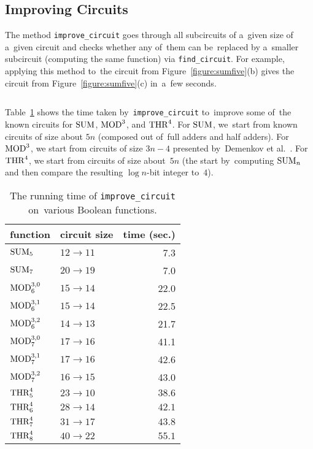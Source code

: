 \subsection{Improving Circuits}
The method \texttt{improve_circuit}
goes through all subcircuits of a~given size
of a~given circuit and checks whether any
of~them can be~replaced by a~smaller subcircuit
(computing the same function) via \texttt{find_circuit}. For example, applying this method
to~the circuit from Figure~\ref{figure:sumfive}(b)
gives the circuit from Figure~\ref{figure:sumfive}(c)
in~a~few seconds.
%
\inputminted[firstline=62,lastline=67]{python}{../tutorial.py}
Table~\ref{table:improvementrunningtimes} shows the time
taken by~\texttt{improve\_circuit} to~improve some
of~the known circuits for $\operatorname{SUM}$, $\operatorname{MOD}^3$, and $\operatorname{THR}^4$.
For $\operatorname{SUM}$, we~start from known circuits of size about $5n$
(composed out of~full adders and half adders). For $\operatorname{MOD}^3$,
we start from circuits of size $3n-4$ presented by~Demenkov et al.~\cite{DBLP:journals/ipl/DemenkovKKY10}. For $\operatorname{THR}^4$, we start from circuits of
size about~$5n$ (the start by~computing $\operatorname{SUM}_n$ and then compare the
resulting $\log n$-bit integer to~$4$).

\begin{table}[ht]
\begin{center}
\begin{tabular}{llr}
\toprule
function & circuit size & time (sec.)\\
\midrule
$\operatorname{SUM}_5$ & $12 \to 11$ & 7.3\\
$\operatorname{SUM}_7$ & $20 \to 19$ & 7.0\\
\midrule
$\operatorname{MOD}_6^{3,0}$ & $15 \to 14$ & 22.0\\
$\operatorname{MOD}_6^{3,1}$ & $15 \to 14$ & 22.5\\
$\operatorname{MOD}_6^{3,2}$ & $14 \to 13$ & 21.7\\
$\operatorname{MOD}_7^{3,0}$ & $17 \to 16$ & 41.1\\
$\operatorname{MOD}_7^{3,1}$ & $17 \to 16$ & 42.6\\
$\operatorname{MOD}_7^{3,2}$ & $16 \to 15$ & 43.0\\
\midrule
$\operatorname{THR}^4_5$ & $23 \to 10$ & $38.6$\\
$\operatorname{THR}^4_6$ & $28 \to 14$ & $42.1$\\
$\operatorname{THR}^4_7$ & $31 \to 17$ & $43.8$\\
$\operatorname{THR}^4_8$ & $40 \to 22$ & $55.1$\\
\bottomrule
\end{tabular}
\end{center}
\caption{The running time of \texttt{improve\_circuit} on~various Boolean functions.} \label{table:improvementrunningtimes}
\end{table}

